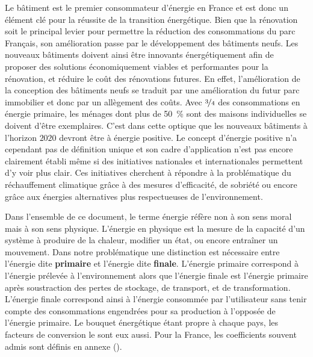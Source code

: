 Le bâtiment est le premier consommateur d’énergie en France et est donc un élément clé
pour la réussite de la transition énergétique. Bien que la rénovation soit le principal
levier pour permettre la réduction des consommations du parc Français, son amélioration
passe par le développement des bâtiments neufs. Les nouveaux bâtiments doivent ainsi être
innovants énergétiquement afin de proposer des solutions économiquement viables et
performantes pour la rénovation, et réduire le coût des rénovations futures. En effet,
l’amélioration de la conception des bâtiments neufs se traduit par une amélioration du
futur parc immobilier et donc par un allègement des coûts. Avec $\nicefrac{3}{4}$ des
consommations en énergie primaire, les ménages dont plus de \SI{50}{\percent} sont des
maisons individuelles se doivent d’être exemplaires. C’est dans cette optique que les
nouveaux bâtiments à l’horizon $2020$ devront être à énergie positive. Le concept
d’énergie positive n’a cependant pas de définition unique et son cadre d’application n’est
pas encore clairement établi même si des initiatives nationales et internationales
permettent d’y voir plus clair. Ces initiatives cherchent à répondre à la problématique du
réchauffement climatique grâce à des mesures d’efficacité, de sobriété ou encore grâce aux
énergies alternatives plus respectueuses de l’environnement.

\begin{Def}[Énergie]\label{def:energie}
Dans l’ensemble de ce document, le terme énergie réfère non à son sens moral mais à son
sens physique. L’énergie en physique est la mesure de la capacité d’un système à produire
de la chaleur, modifier un état, ou encore entraîner un mouvement. Dans notre
problématique une distinction est nécessaire entre l’énergie dite \textbf{primaire} et
l’énergie dite \textbf{finale}. L’énergie primaire correspond à l’énergie prélevée à
l’environnement alors que l’énergie finale est l’énergie primaire après soustraction des
pertes de stockage, de transport, et de transformation. L’énergie finale correspond ainsi
à l’énergie consommée par l’utilisateur sans tenir compte des consommations engendrées pour sa
production à l’opposée de l’énergie primaire. Le bouquet énergétique étant propre à chaque
pays, les facteurs de conversion le sont eux aussi. Pour la France,
les coefficients souvent admis sont définis en annexe ().
\end{Def}

